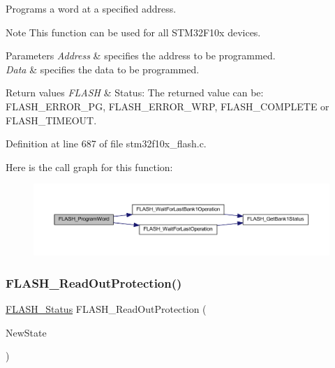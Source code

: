 Programs a word at a specified address. 

\begin{DoxyNote}{Note}
This function can be used for all S\+T\+M32\+F10x devices. 
\end{DoxyNote}

\begin{DoxyParams}{Parameters}
{\em Address} & specifies the address to be programmed. \\
\hline
{\em Data} & specifies the data to be programmed. \\
\hline
\end{DoxyParams}

\begin{DoxyRetVals}{Return values}
{\em F\+L\+A\+SH} & Status\+: The returned value can be\+: F\+L\+A\+S\+H\+\_\+\+E\+R\+R\+O\+R\+\_\+\+PG, F\+L\+A\+S\+H\+\_\+\+E\+R\+R\+O\+R\+\_\+\+W\+RP, F\+L\+A\+S\+H\+\_\+\+C\+O\+M\+P\+L\+E\+TE or F\+L\+A\+S\+H\+\_\+\+T\+I\+M\+E\+O\+UT. \\
\hline
\end{DoxyRetVals}


Definition at line 687 of file stm32f10x\+\_\+flash.\+c.

Here is the call graph for this function\+:
\nopagebreak
\begin{figure}[H]
\begin{center}
\leavevmode
\includegraphics[width=350pt]{group___f_l_a_s_h___exported___functions_gaac9a2f400b92537bd42a6bd7cc237b11_cgraph}
\end{center}
\end{figure}
\mbox{\label{group___f_l_a_s_h___exported___functions_ga0b8d1a8277950c890bbc247bbeafb40f}} 
\subsubsection{\texorpdfstring{F\+L\+A\+S\+H\+\_\+\+Read\+Out\+Protection()}{FLASH\_ReadOutProtection()}}
{\footnotesize\ttfamily \hyperlink{group___f_l_a_s_h___exported___types_gadc63a6f3404ff1f71229a66915e9cdc0}{F\+L\+A\+S\+H\+\_\+\+Status} F\+L\+A\+S\+H\+\_\+\+Read\+Out\+Protection (\begin{DoxyParamCaption}\item[{\hyperlink{group___exported__types_gac9a7e9a35d2513ec15c3b537aaa4fba1}{Functional\+State}}]{New\+State }\end{DoxyParamCaption})}



